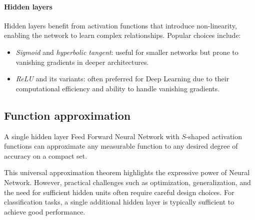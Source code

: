 \paragraph*{Hidden layers}
Hidden layers benefit from activation functions that introduce non-linearity, enabling the network to learn complex relationships. Popular choices include:
\begin{itemize}
    \item \textit{Sigmoid} and \textit{hyperbolic tangent}: useful for smaller networks but prone to vanishing gradients in deeper architectures.
    \item \textit{ReLU} and its variants: often preferred for Deep Learning due to their computational efficiency and ability to handle vanishing gradients.
\end{itemize}

\subsection{Function approximation}
\begin{theorem}
    A single hidden layer Feed Forward Neural Network with $S$-shaped activation functions can approximate any measurable function to any desired degree of accuracy on a compact set.
\end{theorem}
This universal approximation theorem highlights the expressive power of Neural Network. 
However, practical challenges such as optimization, generalization, and the need for sufficient hidden units often require careful design choices.
For classification tasks, a single additional hidden layer is typically sufficient to achieve good performance.